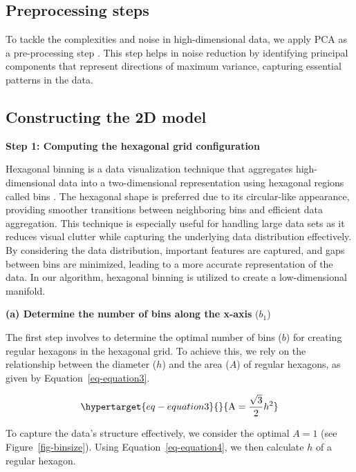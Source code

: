 \documentclass[
  12pt]{article}
\begin{document}
\hypertarget{preprocessing-steps}{%
\subsection{Preprocessing steps}\label{preprocessing-steps}}

To tackle the complexities and noise in high-dimensional data, we apply
PCA as a pre-processing step \citep[\citet{article68},
\citet{article69}]{article67}. This step helps in noise reduction by
identifying principal components that represent directions of maximum
variance, capturing essential patterns in the data.

\hypertarget{constructing-the-2d-model}{%
\subsection{Constructing the 2D model}\label{constructing-the-2d-model}}

\textbf{Step 1: Computing the hexagonal grid configuration}

Hexagonal binning is a data visualization technique that aggregates
high-dimensional data into a two-dimensional representation using
hexagonal regions called bins \citep{article66}. The hexagonal shape is
preferred due to its circular-like appearance, providing smoother
transitions between neighboring bins and efficient data aggregation.
This technique is especially useful for handling large data sets as it
reduces visual clutter while capturing the underlying data distribution
effectively. By considering the data distribution, important features
are captured, and gaps between bins are minimized, leading to a more
accurate representation of the data. In our algorithm, hexagonal binning
is utilized to create a low-dimensional manifold.

\textbf{(a) Determine the number of bins along the x-axis} (\(b_1\))

The first step involves to determine the optimal number of bins (\(b\))
for creating regular hexagons in the hexagonal grid. To achieve this, we
rely on the relationship between the diameter (\(h\)) and the area
(\(A\)) of regular hexagons, as given by Equation~\ref{eq-equation3}.

\begin{equation}\protect\hypertarget{eq-equation3}{}{
 \text{A} = \frac{\sqrt{3}}{2}h^2
}\label{eq-equation3}\end{equation}

To capture the data's structure effectively, we consider the optimal
\(A = 1\) (see Figure~\ref{fig-binsize}). Using
Equation~\ref{eq-equation4}, we then calculate \(h\) of a regular
hexagon.
\end{document}
